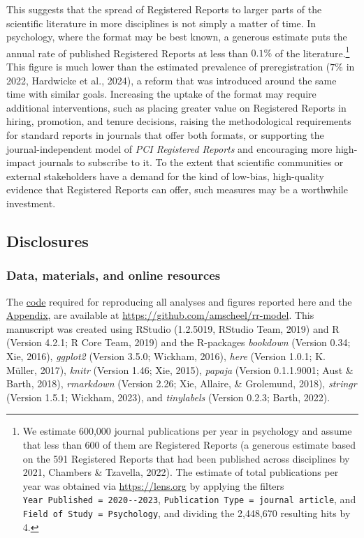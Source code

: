 \documentclass[
  ,man,mask,floatsintext]{apa6}
\begin{document}
This suggests that the spread of Registered Reports to larger parts of the scientific literature in more disciplines is not simply a matter of time.
In psychology, where the format may be best known, a generous estimate puts the annual rate of published Registered Reports at less than \(0.1\%\) of the literature.\footnote{We estimate 600,000 journal publications per year in psychology and assume that less than 600 of them are Registered Reports (a generous estimate based on the 591 Registered Reports that had been published across disciplines by 2021, Chambers \& Tzavella, 2022). The estimate of total publications per year was obtained via \url{https://lens.org} by applying the filters \texttt{Year\ Published\ =\ 2020-\/-2023}, \texttt{Publication\ Type\ =\ journal\ article}, and \texttt{Field\ of\ Study\ =\ Psychology}, and dividing the 2,448,670 resulting hits by 4.}
This figure is much lower than the estimated prevalence of preregistration (\(7\%\) in 2022, Hardwicke et al., 2024), a reform that was introduced around the same time with similar goals.
Increasing the uptake of the format may require additional interventions, such as placing greater value on Registered Reports in hiring, promotion, and tenure decisions, raising the methodological requirements for standard reports in journals that offer both formats, or supporting the journal-independent model of \emph{PCI Registered Reports} and encouraging more high-impact journals to subscribe to it.
To the extent that scientific communities or external stakeholders have a demand for the kind of low-bias, high-quality evidence that Registered Reports can offer, such measures may be a worthwhile investment.

\hypertarget{disclosures}{%
\subsection{Disclosures}\label{disclosures}}

\hypertarget{data-materials-and-online-resources}{%
\subsubsection{Data, materials, and online resources}\label{data-materials-and-online-resources}}

The \href{https://github.com/amscheel/rr-model/tree/master/code}{code} required for reproducing all analyses and figures reported here and the \href{https://osf.io/qw798/}{Appendix}, are available at \url{https://github.com/amscheel/rr-model}.
This manuscript was created using RStudio (1.2.5019, RStudio Team, 2019) and R (Version 4.2.1; R Core Team, 2019) and the R-packages \emph{bookdown} (Version 0.34; Xie, 2016), \emph{ggplot2} (Version 3.5.0; Wickham, 2016), \emph{here} (Version 1.0.1; K. Müller, 2017), \emph{knitr} (Version 1.46; Xie, 2015), \emph{papaja} (Version 0.1.1.9001; Aust \& Barth, 2018), \emph{rmarkdown} (Version 2.26; Xie, Allaire, \& Grolemund, 2018), \emph{stringr} (Version 1.5.1; Wickham, 2023), and \emph{tinylabels} (Version 0.2.3; Barth, 2022).
\end{document}
